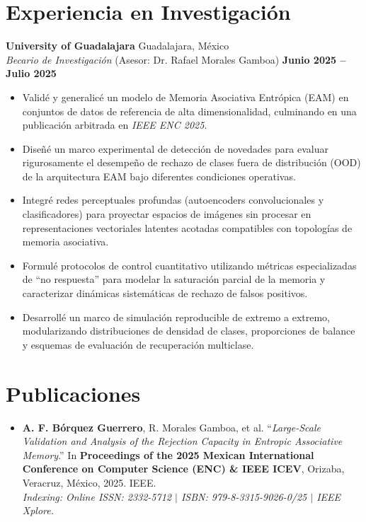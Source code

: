 \documentclass[11pt]{article}
\begin{document}
\section*{Experiencia en Investigación}
\textbf{University of Guadalajara} \hfill Guadalajara, México \\
\textit{Becario de Investigación} (Asesor: Dr. Rafael Morales Gamboa) \hfill \textbf{Junio 2025 -- Julio 2025}
\vspace{-0.3cm}
\begin{itemize}
    \item Validé y generalicé un modelo de Memoria Asociativa Entrópica (EAM) en conjuntos de datos de referencia de alta dimensionalidad, culminando en una publicación arbitrada en \textit{IEEE ENC 2025}.

    \vspace{-0.3cm}
    \item Diseñé un marco experimental de detección de novedades para evaluar rigurosamente el desempeño de rechazo de clases fuera de distribución (OOD) de la arquitectura EAM bajo diferentes condiciones operativas.

    \vspace{-0.3cm}
    \item Integré redes perceptuales profundas (autoencoders convolucionales y clasificadores) para proyectar espacios de imágenes sin procesar en representaciones vectoriales latentes acotadas compatibles con topologías de memoria asociativa.

    \vspace{-0.3cm}
    \item Formulé protocolos de control cuantitativo utilizando métricas especializadas de ``no respuesta'' para modelar la saturación parcial de la memoria y caracterizar dinámicas sistemáticas de rechazo de falsos positivos.

    \vspace{-0.3cm}
    \item Desarrollé un marco de simulación reproducible de extremo a extremo, modularizando distribuciones de densidad de clases, proporciones de balance y esquemas de evaluación de recuperación multiclase.
\end{itemize}


\section*{Publicaciones}
\begin{itemize}
    \item \textbf{A. F. Bórquez Guerrero}, R. Morales Gamboa, et al. ``\textit{Large-Scale Validation and Analysis of the Rejection Capacity in Entropic Associative Memory}.'' In \textbf{Proceedings of the 2025 Mexican International Conference on Computer Science (ENC) \& IEEE ICEV}, Orizaba, Veracruz, México, 2025. IEEE. \\
    \footnotesize\textit{Indexing: Online ISSN: 2332-5712 $\vert$ ISBN: 979-8-3315-9026-0/25 $\vert$ IEEE Xplore.}
\end{itemize}
\end{document}
